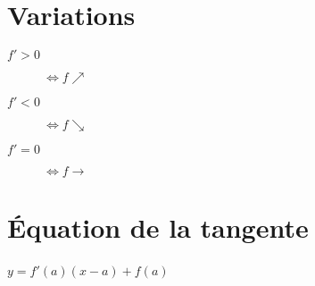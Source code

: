 \documentclass[columns=2]{cheatsheet}
\begin{document}
\section{Variations}
\begin{description}
    \item[$f'>0$] $\Leftrightarrow f \nearrow$ 
    \item[$f'<0$] $\Leftrightarrow f \searrow$ 
    \item[$f'=0$] $\Leftrightarrow f \rightarrow$ 
\end{description}
\section{Équation de la tangente}
$y=f'(a)(x-a)+f(a)$
~

~

~

~
\end{document}
